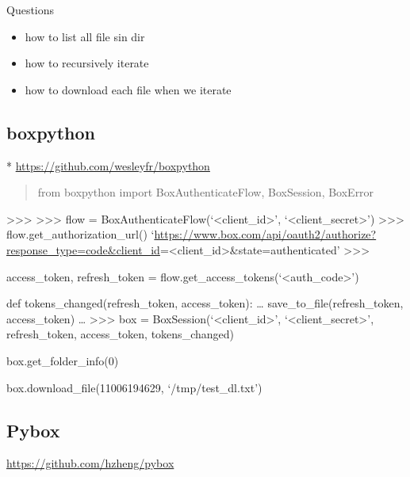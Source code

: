 Questions

\begin{itemize}
\tightlist
\item
  how to list all file sin dir
\item
  how to recursively iterate
\item
  how to download each file when we iterate
\end{itemize}

\subsection{boxpython}\label{boxpython}

* \url{https://github.com/wesleyfr/boxpython}

\begin{quote}
from boxpython import BoxAuthenticateFlow, BoxSession, BoxError
\end{quote}

\textgreater{}\textgreater{}\textgreater{}
\textgreater{}\textgreater{}\textgreater{} flow =
BoxAuthenticateFlow(`\textless{}client\_id\textgreater{}',
`\textless{}client\_secret\textgreater{}')
\textgreater{}\textgreater{}\textgreater{}
flow.get\_authorization\_url()
`\url{https://www.box.com/api/oauth2/authorize?response_type=code\&client_id}=\textless{}client\_id\textgreater{}\&state=authenticated'
\textgreater{}\textgreater{}\textgreater{}

access\_token, refresh\_token =
flow.get\_access\_tokens(`\textless{}auth\_code\textgreater{}')

def tokens\_changed(refresh\_token, access\_token): \ldots{}
save\_to\_file(refresh\_token, access\_token) \ldots{}
\textgreater{}\textgreater{}\textgreater{} box =
BoxSession(`\textless{}client\_id\textgreater{}',
`\textless{}client\_secret\textgreater{}', refresh\_token,
access\_token, tokens\_changed)

box.get\_folder\_info(0)

box.download\_file(11006194629, `/tmp/test\_dl.txt')

\subsection{Pybox}\label{pybox}

\url{https://github.com/hzheng/pybox}
